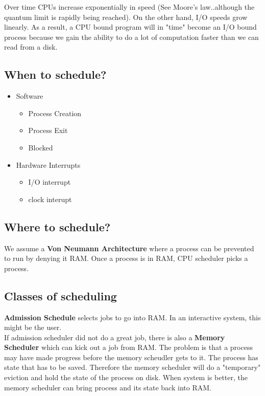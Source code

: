\documentclass[../base_file/cs1550_notes.tex]{subfiles}
\begin{document}
Over time CPUs increase exponentially in speed (See Moore's law..although the 
quantum limit is rapidly being reached).
On the other hand, I/O speeds grow linearly.
As a result, a CPU bound program will in "time" become an I/O bound process
because we gain the ability to do a lot of computation faster than we can
read from a disk.\\
\pagebreak
\subsection{When to schedule?}
	\begin{multicols}{2}	
	\begin{itemize}
	\item Software
		\begin{itemize}
		\item Process Creation
		\item Process Exit
		\item Blocked
		\end{itemize}
	\columnbreak
	\item Hardware Interrupts
		\begin{itemize}
		\item I/O interrupt
		\item clock interupt
		\end{itemize}
	\end{itemize}
	\end{multicols}

\subsection{Where to schedule?}
We assume a \textbf{Von Neumann Architecture} where a process can be prevented
to run by denying it RAM\@.
Once a process is in RAM, CPU scheduler picks a process.\\

\subsection{Classes of scheduling}
\textbf{Admission Schedule} selects jobs to go into RAM\@.
In an interactive system, this might be the user.\\

If admission scheduler did not do a great job, there is also a \textbf{Memory 
Scheduler} which can kick out a job from RAM\@.
The problem is that a process may have made progress before the memory scheudler
gets to it.
The process has state that has to be saved.  Therefore the memory scheduler
will do a "temporary" eviction and hold the state of the process on disk.
When system is better, the memory scheduler can bring process and its
state back into RAM.\\
\end{document}
